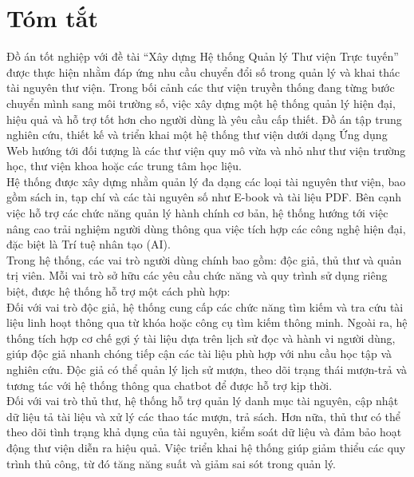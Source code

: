 \section*{Tóm tắt}
\thispagestyle{empty}

Đồ án tốt nghiệp với đề tài “Xây dựng Hệ thống Quản lý Thư viện Trực tuyến” được thực hiện nhằm đáp ứng nhu cầu chuyển đổi số trong quản lý và khai thác tài nguyên thư viện. Trong bối cảnh các thư viện truyền thống đang từng bước chuyển mình sang môi trường số, việc xây dựng một hệ thống quản lý hiện đại, hiệu quả và hỗ trợ tốt hơn cho người dùng là yêu cầu cấp thiết. Đồ án tập trung nghiên cứu, thiết kế và triển khai một hệ thống thư viện dưới dạng Ứng dụng Web hướng tới đối tượng là các thư viện quy mô vừa và nhỏ như thư viện trường học, thư viện khoa hoặc các trung tâm học liệu.\\

Hệ thống được xây dựng nhằm quản lý đa dạng các loại tài nguyên thư viện, bao gồm sách in, tạp chí và các tài nguyên số như E-book và tài liệu PDF. Bên cạnh việc hỗ trợ các chức năng quản lý hành chính cơ bản, hệ thống hướng tới việc nâng cao trải nghiệm người dùng thông qua việc tích hợp các công nghệ hiện đại, đặc biệt là Trí tuệ nhân tạo (AI).\\

Trong hệ thống, các vai trò người dùng chính bao gồm: độc giả, thủ thư và quản trị viên. Mỗi vai trò sở hữu các yêu cầu chức năng và quy trình sử dụng riêng biệt, được hệ thống hỗ trợ một cách phù hợp:\\

Đối với vai trò độc giả, hệ thống cung cấp các chức năng tìm kiếm và tra cứu tài liệu linh hoạt thông qua từ khóa hoặc công cụ tìm kiếm thông minh. Ngoài ra, hệ thống tích hợp cơ chế gợi ý tài liệu dựa trên lịch sử đọc và hành vi người dùng, giúp độc giả nhanh chóng tiếp cận các tài liệu phù hợp với nhu cầu học tập và nghiên cứu. Độc giả có thể quản lý lịch sử mượn, theo dõi trạng thái mượn-trả và tương tác với hệ thống thông qua chatbot để được hỗ trợ kịp thời.\\

Đối với vai trò thủ thư, hệ thống hỗ trợ quản lý danh mục tài nguyên, cập nhật dữ liệu tả tài liệu và xử lý các thao tác mượn, trả sách. Hơn nữa, thủ thư có thể theo dõi tình trạng khả dụng của tài nguyên, kiểm soát dữ liệu và đảm bảo hoạt động thư viện diễn ra hiệu quả. Việc triển khai hệ thống giúp giảm thiểu các quy trình thủ công, từ đó tăng năng suất và giảm sai sót trong quản lý.\\

